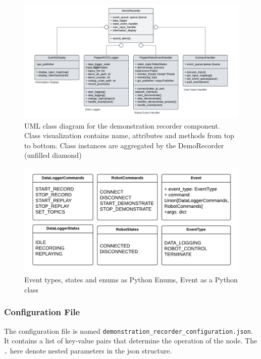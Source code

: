 \documentclass{CSSRforAfrica}
\begin{document}
\begin{figure}[htb]
    \centering
    \includegraphics[width=\linewidth]{figures/DemoRecorder.pdf}
    \caption{UML class diagram for the demonstration recorder component. Class visualization contains name, attributes and methods from top to bottom. Class instances are aggregated by the DemoRecorder (unfilled diamond)}
    \label{fig:recorderuml}
\end{figure}

\begin{figure}[htb]
    \centering
    \includegraphics[width=\linewidth]{figures/states.pdf}
    \caption{Event types, states and enums as Python Enums, Event as a Python class}
    \label{fig:states}
\end{figure}


\subsubsection*{Configuration File}
The configuration file is named \texttt{demonstration\_recorder\_configuration.json}. It contains a list of key-value pairs that determine the operation of the node. The \texttt{.} here denote nested parameters in the json structure.
\end{document}
